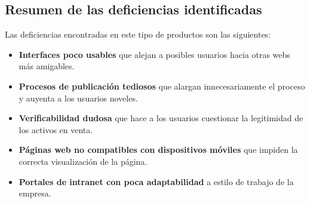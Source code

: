 \subsection{Resumen de las deficiencias identificadas}
\par Las deficiencias encontradas en este tipo de productos son las siguientes:
\begin{itemize}
	\item \textbf{Interfaces poco usables} que alejan a posibles usuarios hacia otras webs más amigables.
	\item \textbf{Procesos de publicación tediosos} que alargan innecesariamente el proceso y auyenta a los usuarios noveles.
	\item \textbf{Verificabilidad dudosa} que hace a los usuarios cuestionar la legitimidad de los activos en venta.
	\item \textbf{Páginas web no compatibles con dispositivos móviles} que impiden la correcta visualización de la página.
	\item \textbf{Portales de intranet con poca adaptabilidad} a estilo de trabajo de la empresa.
\end{itemize}
